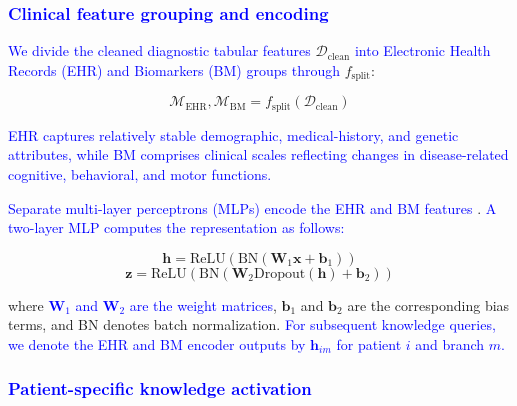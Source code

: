 \documentclass[lettersize,journal]{IEEEtran}
\begin{document}
    \subsubsection{\textcolor{blue}{Clinical feature grouping and encoding}}
    
    \textcolor{blue}{We divide the cleaned diagnostic tabular features} $\mathcal{D}_{\mathrm{clean}}$ \textcolor{blue}{into Electronic Health Records (EHR) and Biomarkers (BM) groups through} $f_{\mathrm{split}}$:

    
    \begin{equation}
        \mathcal{M}_{\mathrm{EHR}}, \mathcal{M}_{\mathrm{BM}} = f_{\mathrm{split}}(\mathcal{D}_{\mathrm{clean}})
        \label{eq:modality_split}
    \end{equation}


    \textcolor{blue}{EHR captures relatively stable demographic, medical-history, and genetic attributes, while BM comprises clinical scales reflecting changes in disease-related cognitive, behavioral, and motor functions.}
    
    \textcolor{blue}{Separate multi-layer perceptrons (MLPs) encode the EHR and BM features} \cite{wang2024unity}. \textcolor{blue}{A two-layer MLP computes the representation as follows:}
    
    \begin{equation}
    \mathbf{h} = \text{ReLU}(\text{BN}(\mathbf{W}_1 \mathbf{x} + \mathbf{b}_1))
    \label{eq:MLP_1}
    \end{equation}
    \begin{equation}
    \mathbf{z} = \text{ReLU}(\text{BN}(\mathbf{W}_2 \text{Dropout}(\mathbf{h}) + \mathbf{b}_2))
    \label{eq:MLP_2}
    \end{equation}

    where \textcolor{blue}{$\mathbf{W}_1$ and $\mathbf{W}_2$ are the weight matrices}, $\mathbf{b}_1$ and $\mathbf{b}_2$ are the corresponding bias terms, and BN denotes batch normalization. \textcolor{blue}{For subsequent knowledge queries, we denote the EHR and BM encoder outputs by $\mathbf h_{im}$ for patient $i$ and branch $m$.}

\subsubsection{\textcolor{blue}{Patient-specific knowledge activation}}
\end{document}
